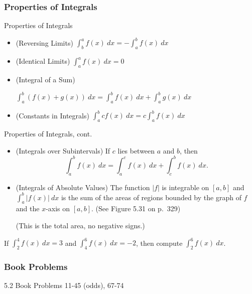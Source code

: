 \documentclass[cal1spr16Lectures.tex]{subfiles}
\begin{document}
\subsubsection{Properties of Integrals}

\begin{frame}{\small Properties of Integrals}\footnotesize
\begin{itemize}
\item[1.] (Reversing Limits) $\int_b^a f(x)\ dx = -\int_a^b f(x)\ dx$

\vspace{0.75pc}
\item[2.] (Identical Limits) $\int_a^a f(x)\ dx = 0$

\vspace{0.75pc}
\item[3.] (Integral of a Sum) 

$\int_a^b (f(x)+g(x))\ dx = \int_a^b f(x)\ dx + \int_a^b g(x)\ dx$

\vspace{0.75pc}
\item[4.] (Constants in Integrals) $\int_a^b cf(x)\ dx = c \int_a^b f(x)\ dx$
\end{itemize}
\end{frame}

\begin{frame}{\small Properties of Integrals, cont.}\footnotesize
\begin{itemize}
\item[5.] (Integrals over Subintervals) If $c$ lies between $a$ and $b$, then
\[
\int_a^b f(x)\ dx = \int_a^c f(x)\ dx + \int_c^b f(x)\ dx.
\]

\item[6.] (Integrals of Absolute Values) The function $|f|$ is integrable on $[a,b]$ and $\int_a^b |f(x)|\ dx$ is the sum of the areas of regions bounded by the graph of $f$ and the $x$-axis on $[a,b]$.  (See Figure 5.31 on p.\ 329) 

\vspace{0.5pc}
\alert{(This is the total area, no negative signs.)}
\end{itemize}
\end{frame}

\begin{frame}\small
\begin{exe} 
If $\int_2^4 f(x)\ dx = 3$ and $\int_4^6 f(x)\ dx = -2$, then compute 
$\int_2^6 f(x)\ dx$. 
\end{exe}
\end{frame}

\subsubsection{Book Problems}

\begin{frame}
\begin{block}{5.2 Book Problems}
11-45 (odds), 67-74
\end{block}
\end{frame}
\end{document}
